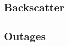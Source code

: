 \documentclass[manuscript,nonacm]{acmart}
\begin{document}
\subsection{Backscatter}

\subsection{Outages}






\end{document}

